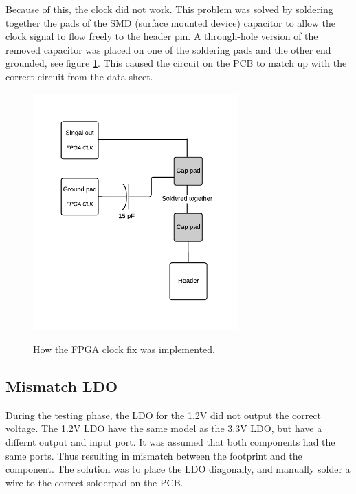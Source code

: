 \documentclass[../main/report.tex]{subfiles}
\begin{document}
Because of this, the clock did not work.
This problem was solved by soldering together the pads of the SMD (surface mounted device) capacitor to allow the clock signal to flow freely to the header pin.
A through-hole version of the removed capacitor was placed on one of the soldering pads and the other end grounded, see figure \ref{fig:pcb-clock-fix}.
This caused the circuit on the PCB to match up with the correct circuit from the data sheet.

\begin{figure}[H]
    \centering
    \includegraphics[width=0.7\textwidth]{../pcb/assets/pcb-clock-fix.pdf}
    \label{fig:pcb-clock-fix}
    \caption{How the FPGA clock fix was implemented.}
\end{figure}

\subsection{Mismatch LDO}
During the testing phase, the LDO for the 1.2V did not output the correct voltage. 
The 1.2V LDO have the same model as the 3.3V LDO, but have a differnt 
output and input port. 
It was assumed that both components had the same ports.
Thus resulting in mismatch between the footprint and the component.
The solution was to place the LDO diagonally,  and manually solder a wire to the correct solderpad on the PCB. 
\end{document}
